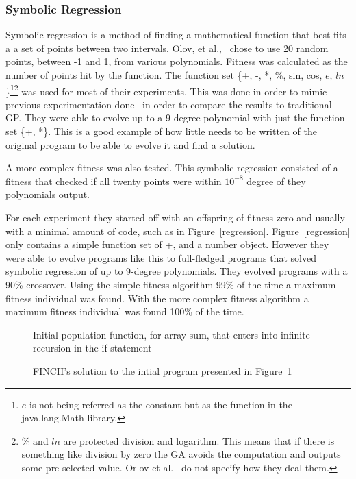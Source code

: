 \documentclass{sig-alternate}
\begin{document}
\subsubsection{Symbolic Regression}
Symbolic regression is a method of finding a mathematical function that best fits a a set of points between two intervals. Olov, et al.,~\cite{FINCH:2011} chose to use 20 random points, between -1 and 1, from various polynomials. Fitness was calculated as the number of points hit by the function. The function set \{+, -, *, \%, sin, cos, $e$, $ln$\}\footnote{$e$ is not being referred as the constant but as the function in the java.lang.Math library.}\footnote{\% and $ln$ are protected division and logarithm. This means that if there is something like division by zero the GA avoids the computation and outputs some pre-selected value. Orlov et al.~\cite{FINCH:2011} do not specify how they deal them.} was used for most of their experiments. This was done in order to mimic previous experimentation done~\cite{koza:1992} in order to compare the results to traditional GP. They were able to evolve up to a 9-degree polynomial with just the function set \{+, *\}. This is a good example of how little needs to be written of the original program to be able to evolve it and find a solution.

A more complex fitness was also tested. This symbolic regression consisted of a fitness that checked if all twenty points were within $10^{-8}$ degree of they polynomials output. 

For each experiment they started off with an offspring of fitness zero and usually with a minimal amount of code, such as in Figure~\ref{regression}. Figure~\ref{regression} only contains a simple function set of {+, \*} and a number object. However they were able to evolve programs like this to full-fledged programs that solved symbolic regression of up to 9-degree polynomials. 
They evolved programs with a 90\% crossover. Using the simple fitness algorithm 99\% of the time a maximum fitness individual was found. With the more complex fitness algorithm a maximum fitness individual was found 100\% of the time.

\begin{figure}
\centering
{}
\caption{Initial population function, for array sum, that enters into infinite recursion in the if statement}
\label{initial rec}
\end{figure}

\begin{figure}
\centering
{}
\caption{FINCH's solution to the intial program presented in Figure~\ref{initial rec}}
\end{figure}
\end{document}
